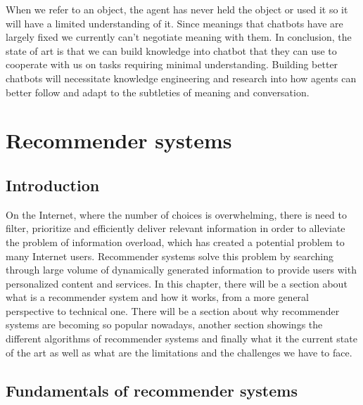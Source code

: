 \documentclass[b5paper,10pt,twoside,cucitura]{toptesi}
\begin{document}
When we refer to an object, the agent has never held the object or used it so it will have a limited understanding of it. Since meanings that chatbots have are largely fixed we currently can't negotiate meaning with them.
In conclusion, the state of art is that we can build knowledge into chatbot that they can use to cooperate with us on tasks requiring minimal understanding. Building better chatbots will necessitate knowledge engineering and research into how agents can better follow and adapt to the subtleties of meaning and conversation.

\newpage

\section{Recommender systems}

\subsection{Introduction}
On the Internet, where the number of choices is overwhelming, there is need to filter, prioritize and efficiently deliver relevant information in order to alleviate the problem of information overload, which has created a potential problem to many Internet users. Recommender systems solve this problem by searching through large volume of dynamically generated information to provide users with personalized content and services.
In this chapter, there will be a section about what is a recommender system and how it works, from a more general perspective to technical one. There will be a section about why recommender systems are becoming so popular nowadays, another section showings the different algorithms of recommender systems and finally what it the current state of the art as well as what are the limitations and the challenges we have to face.

\subsection{Fundamentals of recommender systems}
\end{document}

